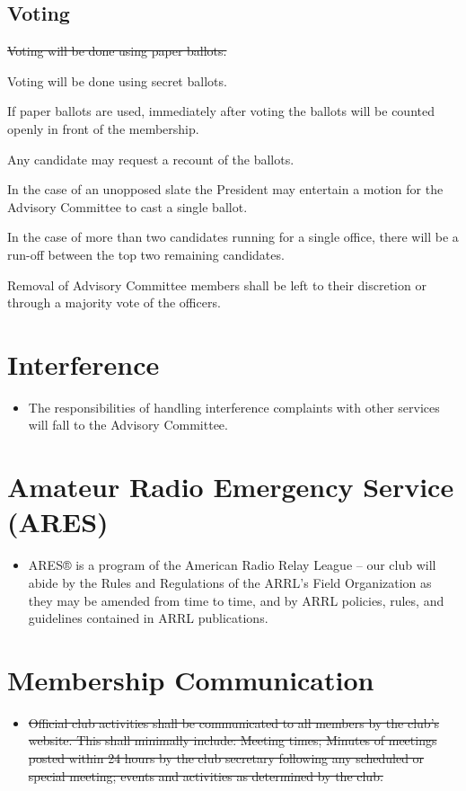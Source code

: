 \documentclass{article}
\begin{document}
\subsection{Voting}
\begin{itemize}
{\color{red} \item  \sout{Voting will be done using paper ballots.}}
{\color{red} \item Voting will be done using secret ballots.}

{\color{red} \item If paper ballots are used, immediately after voting the ballots will be counted openly in front of the membership.}

\item Any candidate may request a recount of the ballots.

\item In the case of an unopposed slate the President may entertain a motion for the Advisory Committee to cast a single ballot.

\item In the case of more than two candidates running for a single office, there will be a run-off between the top two remaining candidates.  

\item Removal of Advisory Committee members shall be left to their discretion or through a majority vote of the officers.
\end{itemize}

\section{Interference}
\begin{itemize}
\item The responsibilities of handling interference complaints with other services will fall to the Advisory Committee.
\end{itemize}

\section{Amateur Radio Emergency Service (ARES)}
\begin{itemize}
\item ARES® is a program of the American Radio Relay League -- our club will abide by the Rules and Regulations of the ARRL’s Field Organization as they may be amended from time to time, and by ARRL policies, rules, and guidelines contained in ARRL publications.
\end{itemize}


{\color{red} 
\section{Membership Communication}
\begin{itemize}
\item \sout{ Official club activities shall be communicated to all members by the club's website.  This shall minimally include: Meeting times; Minutes of meetings posted within 24 hours by the club secretary following any scheduled or special meeting; events and activities as determined by the club.
}
\end{itemize}
}
\end{document}
